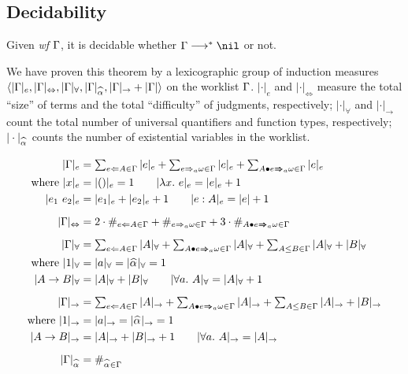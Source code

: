 \subsection{Decidability}
\begin{theorem}[Decidability]
Given \emph{wf }$\Gamma$, it is decidable whether $\Gm\redto\nil$ or not.
\end{theorem}

We have proven this theorem by a lexicographic group of induction measures\\
$\langle |\Gm|_e, |\Gm|_\Leftrightarrow, |\Gm|_\forall, |\Gm|_{\al}, |\Gm|_\to + |\Gm| \rangle$
on the worklist $\Gamma$.
$|\cdot|_e$ and $|\cdot|_\Leftrightarrow$ measure the total ``size'' of terms
and the total ``difficulty'' of judgments, respectively;
$|\cdot|_\forall$ and $|\cdot|_\to$ count the total number of
universal quantifiers and function types, respectively;
$|\cdot|_{\al}$ counts the number of existential variables in the worklist.

\begin{definition}
\begin{gather*}
\begin{aligned}
|\Gm|_e &= \textstyle\sum_{e\Lto A\in\Gm}|e|_e + \sum_{e\To_a \jg\in\Gm}|e|_e +
    \sum_{\appInfAlg{A}{e}\in\Gm}|e|_e\\
\text{where } |x|_e &= |()|_e = 1 \qquad |\lam e|_e = |e|_e + 1\\
|e_1~e_2|_e &= |e_1|_e + |e_2|_e + 1 \qquad |e:A|_e = |e| + 1\\[2mm]
%
|\Gm|_\Leftrightarrow &= 2\cdot\#_{e\Lto A\in\Gm} +
    \#_{e\To_a \jg\in\Gm} + 3\cdot\#_{\appInfAlg{A}{e}\in\Gm}\\[2mm]
|\Gm|_\forall &= \textstyle\sum_{e\Lto A\in\Gm}|A|_\forall + \sum_{\appInfAlg{A}{e}\in\Gm}|A|_\forall +
    \sum_{A\le B\in\Gm} |A|_\forall + |B|_\forall\\
\text{where } |1|_\forall &= |a|_\forall = |\al|_\forall = 1\\
|A\to B|_\forall &= |A|_\forall + |B|_\forall \qquad |\all A|_\forall = |A|_\forall + 1\\[2mm]
%
|\Gm|_\to &= \textstyle\sum_{e\Lto A\in\Gm}|A|_\to + \sum_{\appInfAlg{A}{e}\in\Gm}|A|_\to +
    \sum_{A\le B\in\Gm} |A|_\to + |B|_\to\\
\text{where } |1|_\to &= |a|_\to = |\al|_\to = 1\\
|A\to B|_\to &= |A|_\to + |B|_\to + 1 \qquad |\all A|_\to = |A|_\to\\[2mm]
%
|\Gm|_{\al} &= \#_{\al\in\Gm}\\
\end{aligned}
\end{gather*}
\end{definition}

